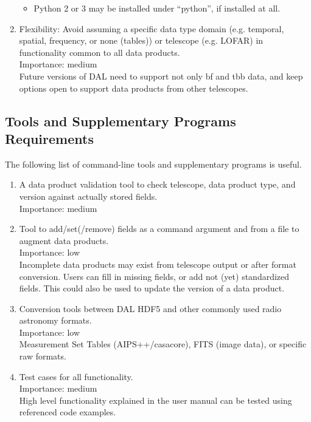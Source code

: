 \documentclass[a4paper,11pt]{article}
\begin{document}
\begin{enumerate}[resume, label=\it R.\arabic{*}]
\begin{itemize}
\item Python 2 or 3 may be installed under ``python'', if installed at all.\\
\end{itemize}

\item \label{req:flex} Flexibility: Avoid assuming a specific data type domain (e.g. temporal, spatial, frequency, or none (tables)) or telescope (e.g. LOFAR) in functionality common to all data products.\\
Importance: medium\\
Future versions of DAL need to support not only bf and tbb data, and keep options open to support data products from other telescopes.

\end{enumerate}


\subsection{Tools and Supplementary Programs Requirements} \label{sec:tools_and_suppl_program_seqs}
The following list of command-line tools and supplementary programs is useful.
\begin{enumerate}[resume, label=\it R.\arabic{*}]
\itemsep0em

\item \label{req:data_prod_valid} A data product validation tool to check telescope, data product type, and version against actually stored fields.\\
Importance: medium\\

\item \label{req:add_fields} Tool to add/set(/remove) fields as a command argument and from a file to augment data products.\\
Importance: low\\
Incomplete data products may exist from telescope output or after format conversion.
Users can fill in missing fields, or add not (yet) standardized fields.
This could also be used to update the version of a data product.

\item \label{req:conv} Conversion tools between DAL HDF5 and other commonly used radio astronomy formats.\\
Importance: low\\
Measurement Set Tables (AIPS++/casacore), FITS (image data), or specific raw formats.

\item \label{req:tests} Test cases for all functionality.\\
Importance: medium\\
High level functionality explained in the user manual can be tested using referenced code examples.

\end{enumerate}
\end{document}
